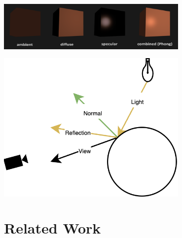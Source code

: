 \begin{minipage}{1\textwidth}
    \centering
    \includegraphics[width=0.7\textwidth]{"images/phong_shading.png"}
    \label{fig:phong_shading}
\end{minipage}

\begin{minipage}{1\textwidth}
    \centering
    \includegraphics[width=0.7\textwidth]{"images/phong_graph.png"}
    \label{fig:phong_graph}
\end{minipage}

\section{Related Work}

